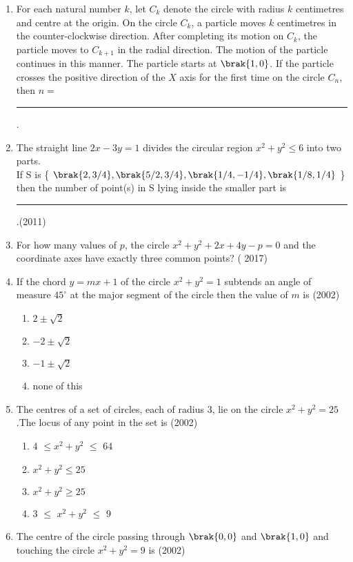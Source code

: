 \begin{enumerate}[label=\thesubsection.\arabic*.,ref=\thesubsection.\theenumi]
%
	\hfill{}
\item For each natural number $k$,  let $C_k$ denote the circle with radius $k$ centimetres and centre at the origin. On the circle $C_k$,  a particle moves $k$ centimetres in the counter-clockwise direction. After completing its motion on $C_k$,  the particle moves to $C_{k+1}$ in the radial direction. The motion of the particle continues in this manner. The particle starts at $\brak{1, 0}$. If the particle crosses the positive direction of the $X$ axis for the first time on the circle $C_n$, then $n=$\rule{1cm}{0.01pt}.
%
	\hfill{}
\item The straight line $2x-3y=1$ divides the circular region $x^2+y^2\leq6$ into two parts.\\
If  S  is \{ $\brak{2, 3/4}, \brak{5/2, 3/4}, \brak{1/4, -1/4}, \brak{1/8, 1/4}$ \}  then the  number of point(s) in S lying inside the smaller part is  \rule{1cm}{0.01pt}.\hfill(2011)
\item For how many values of $p$,  the circle $x^2+y^2+2x+4y-p=0$ and the coordinate axes have exactly three common points? \hfill( 2017)
\item If the chord $y=mx+1$ of the circle $x^2+y^2=1$ subtends an angle of measure \( 45^\circ \) at the major segment of the circle then the value of $m$ is \hfill(2002)
\begin{multicols}{4}
\begin{enumerate}
\item$2\pm\sqrt{2}$
\item$-2\pm\sqrt{2}$
\item$-1\pm\sqrt{2}$
\item none of this
\end{enumerate}
\end{multicols}
\item The centres of a set of circles, each of radius $3$,  lie on the circle $x^2+y^2=25$.The locus of any point in the set is \hfill(2002)
\begin{multicols}{2}
\begin{enumerate}
\item$4$ $\leq$$x^2+y^2$ $\leq$ $64$
\item$x^2+y^2\leq25$
\item$x^2+y^2\geq25$
\item$3$ $\leq$ $x^2+y^2$ $\leq$ $9$
\end{enumerate}
\end{multicols}
\item The centre of the circle passing through $\brak{0, 0}$ and $\brak{1, 0}$ and touching the circle $x^2+y^2=9$ is \hfill(2002)

\end{enumerate}

